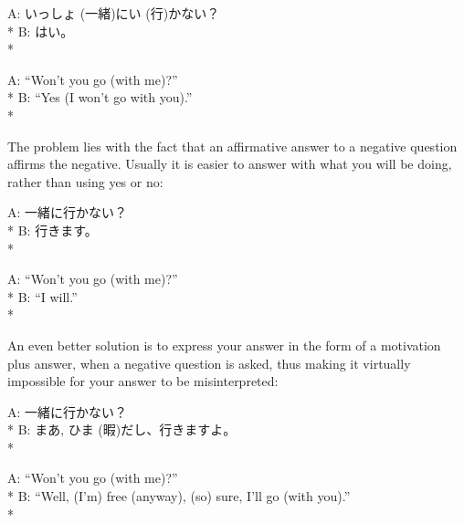 \documentclass[11pt, b5paper, twoside, openright, onecolumn]{book}
\makeatletter
\newcommand*{\rubystack}[2]{{\relscale{0.5}%
  \begin{tabular}[b]{@{}c@{}}%
    {#1}\\%
   {\textscale{2}{#2}}%
  \end{tabular}}%
}
\DeclareRobustCommand*{\ruby}[2]{%
  \mbox{%
    \setlength{\parskip}{0ex}%
    \BeginAccSupp{method=pdfstringdef,ActualText={#1}}%
      \rubystack{\phantom{#2}}{#1}%
      \llap{%
        \rubystack{#2}{\phantom{#1}}%
      }%
    \EndAccSupp{}%
  }%
}
\renewcommand*{\ruby}[2]{#2 (#1)}%
\newenvironment{exampleblock}{
\setlength{\parindent}{0.6in}
\begin{minipage}[t]{\dimexpr\textwidth-\parindent}}
{\end{minipage}}
\makeatother
\begin{document}
\vspace{0.4cm}
\begin{exampleblock}
A: \ruby{一緒}{いっしょ}に\ruby{行}{い}かない？ \\* 
B: はい。 \\* 
\end{exampleblock}
\vspace{0.2cm}

\begin{exampleblock}
A: “Won’t you go (with me)?” \\* 
B: “Yes (I won’t go with you).” \\* 
\end{exampleblock}
\vspace{0.2cm}

The problem lies with the fact that an affirmative answer to a negative question affirms the negative. Usually it is easier to answer with what you will be doing‚ rather than using yes or no:

\vspace{0.4cm}
\begin{exampleblock}
A: 一緒に行かない？ \\* 
B: 行きます。 \\* 
\end{exampleblock}
\vspace{0.2cm}

\begin{exampleblock}
A: “Won’t you go (with me)?” \\* 
B: “I will.” \\* 
\end{exampleblock}
\vspace{0.2cm}

An even better solution is to express your answer in the form of a motivation plus answer‚ when a negative question is asked‚ thus making it virtually impossible for your answer to be misinterpreted:

\vspace{0.4cm}
\begin{exampleblock}
A: 一緒に行かない？ \\* 
B: まあ‚ \ruby{暇}{ひま}だし、行きますよ。 \\* 
\end{exampleblock}
\vspace{0.2cm}

\begin{exampleblock}
A: “Won’t you go (with me)?” \\* 
B: “Well‚ (I’m) free (anyway)‚ (so) sure‚ I’ll go (with you).” \\* 
\end{exampleblock}
\end{document}
